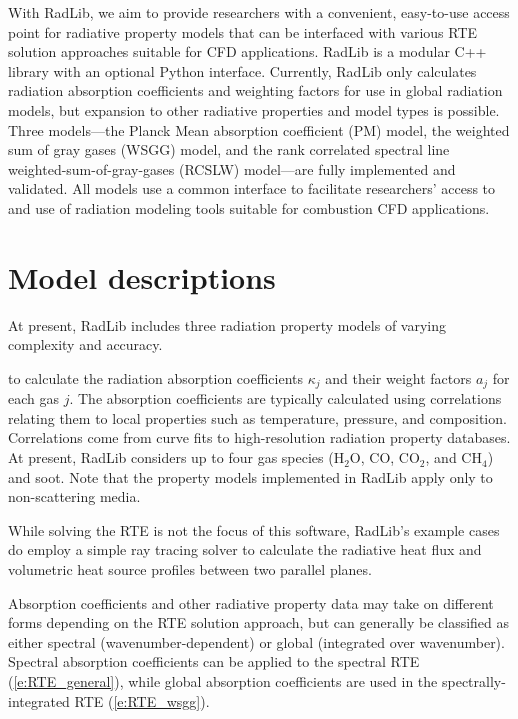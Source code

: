 \documentclass[preprint,12pt]{elsarticle}
\begin{document}
With RadLib, we aim to provide researchers with a convenient, easy-to-use access point for radiative property models that can be interfaced with various RTE solution approaches suitable for CFD applications. RadLib is a modular C++ library with an optional Python interface. Currently, RadLib only calculates radiation absorption coefficients and weighting factors for use in global radiation models, but expansion to other radiative properties and model types is possible. Three models---the Planck Mean absorption coefficient (PM) model, the weighted sum of gray gases (WSGG) model, and the rank correlated spectral line weighted-sum-of-gray-gases (RCSLW) model---are fully implemented and validated. All models use a common interface to facilitate researchers' access to and use of radiation modeling tools suitable for combustion CFD applications.


\section{Model descriptions} \label{s:models}

At present, RadLib includes three radiation property models of varying complexity and accuracy. 


 to calculate the radiation absorption coefficients $\kappa_j$ and their weight factors $a_j$ for each gas $j$. The absorption coefficients are typically calculated using correlations relating them to local properties such as temperature, pressure, and composition. Correlations come from curve fits to high-resolution radiation property databases. At present, RadLib considers up to four gas species (H$_2$O, CO, CO$_2$, and CH$_4$) and soot. Note that the property models implemented in RadLib apply only to non-scattering media. 

While solving the RTE is not the focus of this software, RadLib's example cases do employ a simple ray tracing solver to calculate the radiative heat flux and volumetric heat source profiles between two parallel planes. 

Absorption coefficients and other radiative property data may take on different forms depending on the RTE solution approach, but can generally be classified as either spectral (wavenumber-dependent) or global (integrated over wavenumber). Spectral absorption coefficients can be applied to the spectral RTE (\ref{e:RTE_general}), while global absorption coefficients are used in the spectrally-integrated RTE (\ref{e:RTE_wsgg}). 
\end{document}
